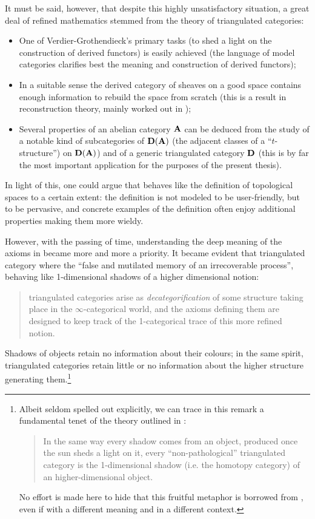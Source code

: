 It must be said, however, that despite this highly unsatisfactory situation, a great deal of refined mathematics stemmed from the theory of triangulated categories:
\begin{itemize} 
\item One of Verdier\hyp{}Grothendieck's primary tasks (to shed a light on the construction of derived functors) is easily achieved (the language of model categories clarifies best the meaning and construction of derived functors); 
\item In a suitable sense the derived category of sheaves on a good space contains enough information to rebuild the space from scratch (this is a result in reconstruction theory, mainly worked out in \cite{bondal2001reconstruction});
\item {} Several properties of an abelian category $\mathbf{A}$ can be deduced from the study of a notable kind of subcategories of $\mathbf{D}(\mathbf{A})$ (the adjacent classes of a ``$t$\hyp{}structure'') on $\mathbf{D}(\mathbf{A})$) and of a generic triangulated category $\mathbf{D}$ (this is by far the most important application for the purposes of the present thesis).
\end{itemize}
In light of this, one could argue that \adef {} behaves like the definition of topological spaces to a certain extent: the definition is not modeled to be user\hyp{}friendly, but to be pervasive, and concrete examples of the definition often enjoy additional properties making them more wieldy. 

However, with the passing of time, understanding the deep meaning of the axioms in \adef {} became more and more a priority. It became evident that triangulated category where the ``false and mutilated memory of an irrecoverable process'', behaving like 1\hyp{}dimensional shadows of a higher dimensional notion: 
\begin{quote}
triangulated categories arise as \emph{decategorification} of some structure taking place in the $\infty$\hyp{}categorical world, and the axioms defining them are designed to keep track of the 1\hyp{}categorical trace of this more refined notion.
\end{quote}
Shadows of objects retain no information about their colours; in the same spirit, triangulated categories retain little or no information about the higher structure generating them.\footnote{Albeit seldom spelled out explicitly, we can trace in this remark a fundamental tenet of the theory outlined in \cite{LurieHA}:
\begin{quote}
In the same way every shadow comes from an object, produced once the sun sheds a light on it, every ``non\hyp{}pathological'' triangulated category is the 1\hyp{}dimensional shadow (i.e. the homotopy category) of an higher\hyp{}dimensional object.
\end{quote}
No effort is made here to hide that this fruitful metaphor is borrowed from \cite{Olivia}, even if with a different meaning and in a different context.}

